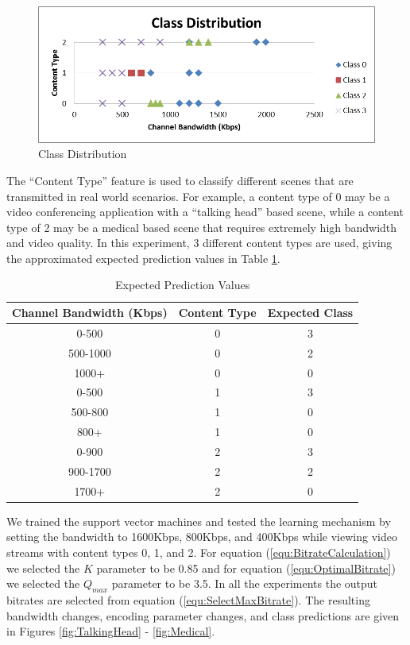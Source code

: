 \begin{figure}[H]
\centering
\includegraphics[width=0.65\linewidth]{images/ClassDistribution.png}
\caption{Class Distribution}
\label{fig:ClassDistribution}
\end{figure}
The ``Content Type'' feature is used to classify different scenes that are transmitted in real world scenarios. For example, a content type of 0 may be a video conferencing application with a ``talking head'' based scene, while a content type of 2 may be a medical based scene that requires extremely high bandwidth and video quality. In this experiment, 3 different content types are used, giving the approximated expected prediction values in Table \ref{tab:ExpectedValues}.
\begin{table}[H]
\centering
\caption{Expected Prediction Values}
\label{tab:ExpectedValues}
\begin{tabular}{c|c|c}
\textbf{Channel Bandwidth (Kbps)}&\textbf{Content Type}&\textbf{Expected Class}\\
\hline
0-500&0&3\\
500-1000&0&2\\
1000+&0&0\\
0-500&1&3\\
500-800&1&0\\
800+&1&0\\
0-900&2&3\\
900-1700&2&2\\
1700+&2&0
\end{tabular}
\end{table}
We trained the support vector machines and tested the learning mechanism by setting the bandwidth to 1600Kbps, 800Kbps, and 400Kbps while viewing video streams with content types 0, 1, and 2. For equation (\ref{equ:BitrateCalculation}) we selected the $K$ parameter to be 0.85 and for equation (\ref{equ:OptimalBitrate}) we selected the $Q_{max}$ parameter to be 3.5. In all the experiments the output bitrates are selected from equation (\ref{equ:SelectMaxBitrate}). The resulting bandwidth changes, encoding parameter changes, and class predictions are given in Figures \ref{fig:TalkingHead} - \ref{fig:Medical}.
